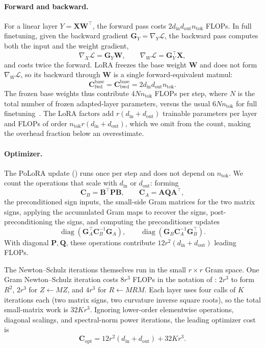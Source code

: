 \documentclass[11pt]{article}
\newcommand{\mat}[1]{\bm{#1}}
\DeclareMathOperator{\diag}{diag}
\newcommand{\methodname}{PoLoRA\xspace}
\begin{document}
\paragraph{Forward and backward.}
For a linear
layer $Y=\mat{X}\mat{W}^\top$, the forward pass costs
$2d_{\mathrm{in}}d_{\mathrm{out}}n_{\mathrm{tok}}$
FLOPs.
In full finetuning, given the backward gradient $\mat{G}_Y=\nabla_Y \mathcal{L}$,
the backward pass computes both the input and the weight gradient,
\[
\nabla_X \mathcal{L} = \mat{G}_Y \mat{W},
\qquad
\nabla_W \mathcal{L} = \mat{G}_Y^\top \mat{X},
\]
and costs twice the forward. LoRA freezes the base weight $\mat{W}$ and does not form
$\nabla_W \mathcal{L}$, so its backward through $\mat{W}$ is a single forward-equivalent matmul:
\begin{equation}
  \mat{C}_{\mathrm{fwd}}^{\mathrm{base}}
  =
  \mat{C}_{\mathrm{bwd}}^{\mathrm{base}}
  =
  2 d_{\mathrm{in}}d_{\mathrm{out}} n_{\mathrm{tok}} .
  \label{eq:flop-fb}
\end{equation}
The frozen base weights thus contribute $4Nn_{\mathrm{tok}}$ FLOPs per step, where $N$ is the total number of frozen adapted-layer parameters, versus the usual $6Nn_{\mathrm{tok}}$ for full finetuning~\cite{kaplan2020scaling}. The LoRA factors add $r(d_{\mathrm{in}}+d_{\mathrm{out}})$ trainable parameters per layer and FLOPs of order $n_{\mathrm{tok}}r(d_{\mathrm{in}}+d_{\mathrm{out}})$, which we omit from the count, making the overhead fraction below an overestimate.

\paragraph{Optimizer.}
The \methodname{} update () runs once per step and does not
depend on $n_{\mathrm{tok}}$.
We count the operations that scale with
$d_{\mathrm{in}}$ or $d_{\mathrm{out}}$: forming
\[
    \mat{C}_B=\mat{B}^\top \mat{P} \mat{B},
    \qquad
    \mat{C}_A=\mat{A} \mat{Q} \mat{A}^\top,
\]
the preconditioned sign inputs, 
the small-side Gram matrices for the two
matrix signs, applying the accumulated Gram maps to recover the signs,
post-preconditioning the signs, and computing the preconditioner updates
\[
    \diag(\mat{G}_A^\top \mat{C}_B^{-1}\mat{G}_A),
    \qquad
    \diag(\mat{G}_B \mat{C}_A^{-1}\mat{G}_B^\top).
\]
With diagonal $\mat{P}, \mat{Q}$, these operations contribute
$12r^2(d_{\mathrm{in}}+d_{\mathrm{out}})$
leading FLOPs.

The Newton--Schulz iterations themselves run in the small $r\times r$ Gram
space.  One Gram Newton--Schulz iteration costs $8r^3$ FLOPs in the notation of
: $2r^3$ to form $R^2$, $2r^3$ for $Z\leftarrow MZ$, and $4r^3$ for
$R\leftarrow MRM$.  Each layer uses four calls of $K$ iterations each (two matrix
signs, two curvature inverse square roots), so the total small-matrix work is $32Kr^3$.
Ignoring lower-order elementwise operations, diagonal scalings, and spectral-norm
power iterations, the leading optimizer cost is
\begin{equation}
  \mat{C}_{\mathrm{opt}}
  =
  12r^2(d_{\mathrm{in}}+d_{\mathrm{out}})
  +
  32Kr^3 .
  \label{eq:flop-opt}
\end{equation}
\end{document}
